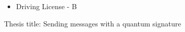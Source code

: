 






\begin{itemize}
\item Driving License - B 
\end{itemize}



Thesis title: Sending messages with a quantum signature

